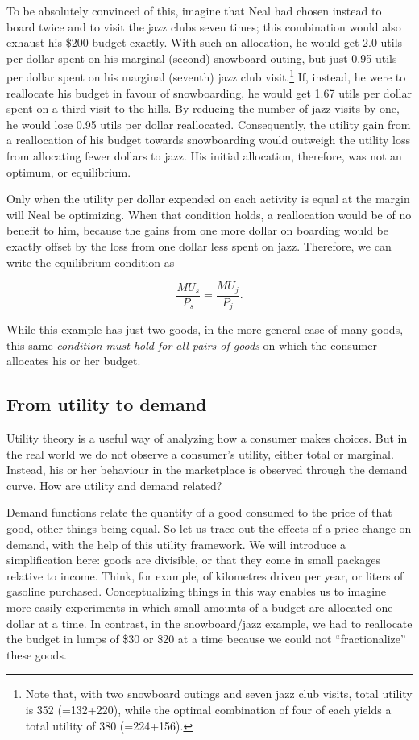 To be absolutely convinced of this, imagine that Neal had chosen instead to board twice and to visit the jazz clubs seven times; this combination would also exhaust his \$200 budget exactly. With such an allocation, he would get 2.0 utils per dollar spent on his marginal (second) snowboard outing, but just 0.95 utils per dollar spent on his marginal (seventh) jazz club visit.\footnote{Note that, with two snowboard outings and seven jazz club visits, total utility is 352 (=132+220), while the optimal combination of four of each yields a total utility of 380 (=224+156).} If, instead, he were to reallocate his budget in favour of snowboarding, he would get 1.67 utils per dollar spent on a third visit to the hills. By reducing the number of jazz visits by one, he would lose 0.95 utils per dollar reallocated. Consequently, the utility gain from a reallocation of his budget towards snowboarding would outweigh the utility loss from allocating fewer dollars to jazz. His initial allocation, therefore, was not an optimum, or equilibrium.

Only when the utility per dollar expended on each activity is equal at the margin will Neal be optimizing. When that condition holds, a reallocation would be of no benefit to him, because the gains from one more dollar on boarding would be exactly offset by the loss from one dollar less spent on jazz. Therefore, we can write the equilibrium condition as

\begin{equation} \label{eq:utilequilibriumcondition}
\frac{MU_s}{P_s}=\frac{MU_j}{P_j}.
\end{equation}

While this example has just two goods, in the more general case of many goods, this same \textit{condition must hold for all pairs of goods} on which the consumer allocates his or her budget.

\subsection*{From utility to demand}

Utility theory is a useful way of analyzing how a consumer makes choices. But in the real world we do not observe a consumer's utility, either total or marginal. Instead, his or her behaviour in the marketplace is observed through the demand curve. How are utility and demand related?

Demand functions relate the quantity of a good consumed to the price of that good, other things being equal. So let us trace out the effects of a price change on demand, with the help of this utility framework. We will introduce a simplification here: goods are divisible, or that they come in small packages relative to income. Think, for example, of kilometres driven per year, or liters of gasoline purchased. Conceptualizing things in this way enables us to imagine more easily experiments in which small amounts of a budget are allocated one dollar at a time. In contrast, in the snowboard/jazz example, we had to reallocate the budget in lumps of \$30 or \$20 at a time because we could not ``fractionalize'' these goods.

